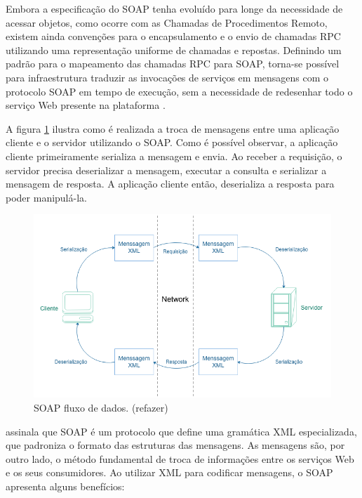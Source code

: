 Embora a especificação do SOAP tenha evoluído para longe da necessidade de acessar objetos, como ocorre com as Chamadas de Procedimentos Remoto, existem ainda convenções para o encapsulamento e o envio de chamadas RPC utilizando uma representação uniforme de chamadas e repostas. Definindo um padrão para o mapeamento das chamadas RPC para SOAP, torna-se possível para infraestrutura traduzir as invocações de serviços em mensagens com o protocolo SOAP em tempo de execução, sem a necessidade de redesenhar todo o serviço Web presente na plataforma \cite{soap-microsoft}.

A figura \ref{fig:soap} ilustra como é realizada a troca de mensagens entre uma aplicação cliente e o servidor utilizando o SOAP. Como é possível observar, a aplicação cliente primeiramente serializa a mensagem e envia. Ao receber a requisição, o servidor precisa deserializar a mensagem, executar a consulta e serializar a mensagem de resposta. A aplicação cliente então, deserializa a resposta para poder manipulá-la.

\begin{figure}[htbp]
\centering
\includegraphics[width=1\textwidth]{figuras/soap.png}
\caption{SOAP fluxo de dados. (refazer)}
\label{fig:soap}
\author{https://msdn.microsoft.com/en-us/library/x05s00wz(v=vs.80).aspx}
\end{figure}

 assinala que SOAP é um protocolo que define uma gramática XML especializada, que padroniza o formato das estruturas das mensagens. As mensagens são, por outro lado, o método fundamental de troca de informações entre os serviços Web e os seus consumidores. Ao utilizar XML para codificar mensagens,  o SOAP apresenta alguns benefícios:

